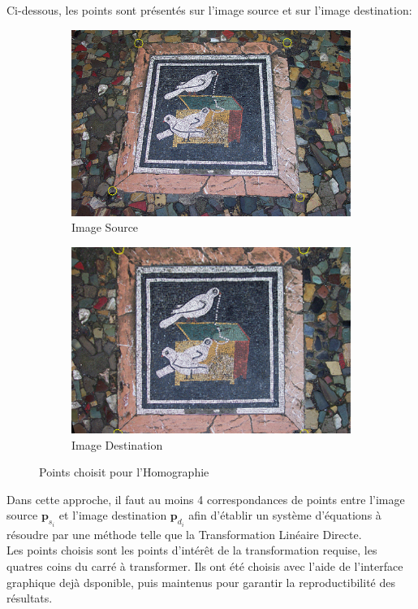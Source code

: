 \documentclass[../5RO17_TP1.tex]{subfiles}
\begin{document}
\noindent Ci-dessous, les points sont présentés sur l'image source et sur l'image destination:
\begin{figure}[ht]
    \centering
    \begin{subfigure}[b]{0.45\textwidth}
        \centering
        \includegraphics[width=\linewidth]{images/image_source_points.png}
        \caption{Image Source}
    \end{subfigure}\hfill
    \begin{subfigure}[b]{0.45\textwidth}
        \centering
        \includegraphics[width=\linewidth]{images/image_corrected.png}
        \caption{Image Destination}
    \end{subfigure}
    \caption{Points choisit pour l'Homographie}
    \label{fig:sidebyside}
\end{figure}

\noindent Dans cette approche, il faut au moins 4 correspondances de points entre l'image source $\mathbf{p}_{s_{i}}$ et l'image destination $\mathbf{p}_{d_{i}}$ afin d'établir un système d'équations à résoudre par une méthode telle que la Transformation Linéaire Directe.\\

\noindent Les points choisis sont les points d'intérêt de la transformation requise, les quatres coins du carré à transformer. Ils ont été choisis avec l'aide de l'interface graphique dejà dsponible, puis maintenus pour garantir la reproductibilité des résultats.
\end{document}
